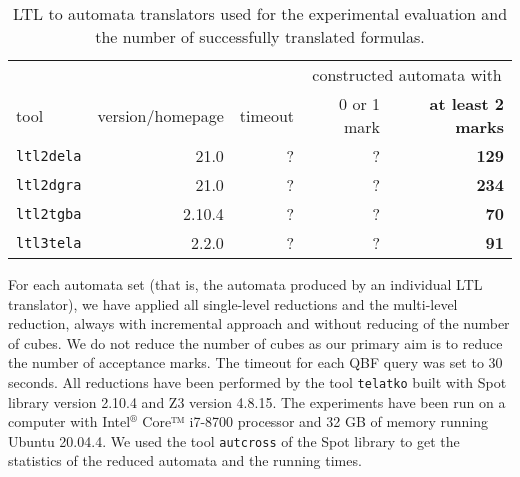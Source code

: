 \documentclass[a4paper,UKenglish,cleveref,autoref,thm-restate]{lipics-v2021}
\newcommand{\todo}[1]{\marginpar{\textcolor{red}{#1}}}
\begin{document}
\begin{table}[t]
\caption{LTL to automata translators used for the experimental evaluation
and the number of successfully translated formulas.}
\label{tab:ltltranslators}
\centering
%
\begin{tabular}{lrrrr}
  \toprule
  &&& \multicolumn{2}{c}{constructed automata with} \\ \cmidrule(lr){4-5}
  tool &\!\!\!version/homepage & timeout & 0 or 1 mark & \textbf{at least 2 marks}\\
  \midrule
  \texttt{ltl2dela} & 21.0\tablefootnote{\label{fn:owl}\url{https://owl.model.in.tum.de/}}
       & ? & ? & \textbf{129} \\
  \texttt{ltl2dgra} & 21.0\footnotemark[1]
       & ? & ? & \textbf{234}\\
  \texttt{ltl2tgba} & 2.10.4\tablefootnote{\url{https://spot.lrde.epita.fr}}
       & ? & ? & \textbf{70}\\
  \texttt{ltl3tela} & 2.2.0\tablefootnote{\url{https://github.com/jurajmajor/ltl3tela}}
       & ? & ? & \textbf{91}\\
  \bottomrule
\end{tabular}
\end{table}

For each automata set (that is, the automata produced by an individual
LTL translator), we have applied all single-level reductions and the
multi-level reduction, always with incremental approach and without
reducing of the number of cubes. We do not reduce the number of cubes
as our primary aim is to reduce the number of acceptance marks.
The timeout for each QBF query was set to 30 seconds.
%
All reductions have been performed by the tool \texttt{telatko}
built with Spot library version 2.10.4 and Z3 version 4.8.15. The
experiments have been run on a computer with Intel$^\text{®}$ Core™ i7-8700
processor and 32 GB of memory running Ubuntu 20.04.4. We used the tool
\texttt{autcross} of the Spot library to get the statistics of the
reduced automata and the running times.
\end{document}
